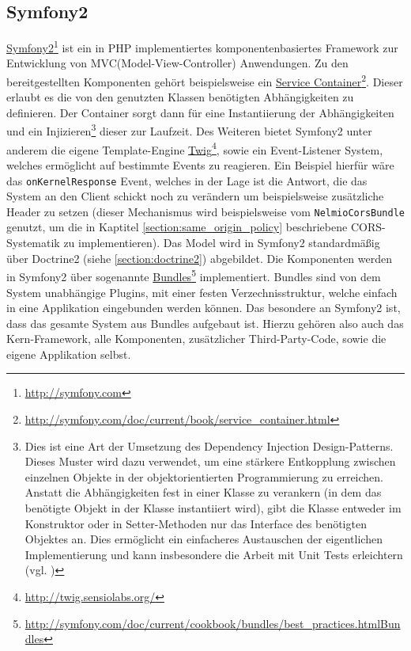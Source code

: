 \subsection{Symfony2}\label{section:symfony2}
\href{http://symfony.com}{Symfony2}\footnote{\url{http://symfony.com}} ist ein in PHP implementiertes komponentenbasiertes Framework zur Entwicklung von MVC(Model-View-Controller) Anwendungen. Zu den bereitgestellten Komponenten gehört beispielsweise ein \href{http://symfony.com/doc/current/book/service_container.html}{Service Container}\footnote{\url{http://symfony.com/doc/current/book/service_container.html}}. Dieser erlaubt es die von den genutzten Klassen benötigten Abhängigkeiten zu definieren. Der Container sorgt dann für eine Instantiierung der Abhängigkeiten und ein Injizieren\footnote{Dies ist eine Art der Umsetzung des Dependency Injection Design-Patterns. Dieses Muster wird dazu verwendet, um eine stärkere Entkopplung zwischen einzelnen Objekte in der objektorientierten Programmierung zu erreichen. Anstatt die Abhängigkeiten fest in einer Klasse zu verankern (in dem das benötigte Objekt in der Klasse instantiiert wird), gibt die Klasse entweder im Konstruktor oder in Setter-Methoden nur das Interface des benötigten Objektes an. Dies ermöglicht ein einfacheres Austauschen der eigentlichen Implementierung und kann insbesondere die Arbeit mit Unit Tests erleichtern (vgl. \cite{Fowler2004})} dieser zur Laufzeit. Des Weiteren bietet Symfony2 unter anderem die eigene Template-Engine \href{http://twig.sensiolabs.org/}{Twig}\footnote{\url{http://twig.sensiolabs.org/}}, sowie ein Event-Listener System, welches ermöglicht auf bestimmte Events zu reagieren. Ein Beispiel hierfür wäre das \texttt{onKernelResponse} Event, welches in der Lage ist die Antwort, die das System an den Client schickt noch zu verändern um beispielsweise zusätzliche Header zu setzen (dieser Mechanismus wird beispielsweise vom \texttt{NelmioCorsBundle} genutzt, um die in Kaptitel \ref{section:same_origin_policy} beschriebene CORS-Systematik zu implementieren). Das Model wird in Symfony2 standardmäßig über Doctrine2 (siehe \ref{section:doctrine2}) abgebildet.
Die Komponenten werden in Symfony2 über sogenannte \href{http://symfony.com/doc/current/cookbook/bundles/best_practices.htmlBundles}{Bundles}\footnote{\url{http://symfony.com/doc/current/cookbook/bundles/best_practices.htmlBundles}} implementiert. Bundles sind von dem System unabhängige Plugins, mit einer festen Verzechnisstruktur, welche einfach in eine Applikation eingebunden werden können. Das besondere an Symfony2 ist, dass das gesamte System aus Bundles aufgebaut ist. Hierzu gehören also auch das Kern-Framework, alle Komponenten, zusätzlicher Third-Party-Code, sowie die eigene Applikation selbst.

